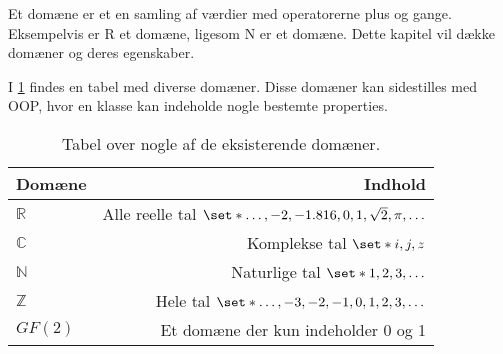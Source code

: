 Et domæne er et en samling af værdier med operatorerne plus og gange.
Eksempelvis er $\mathrm{R}$ et domæne, ligesom $ \mathrm{N}$ er et domæne.
Dette kapitel vil dække domæner og deres egenskaber.

I \cref{tab:fields} findes en tabel med diverse domæner.
Disse domæner kan sidestilles med OOP, hvor en klasse kan indeholde nogle bestemte properties.
\begin{table}[h]
    \centering
    \begin{tabular}{|l|r|}
        \hline
        Domæne & Indhold\\\hline
        $\mathbb{R}$ & Alle reelle tal $\set*{\dots,-2,-1.816,0,1,\sqrt{2},\pi,\dots}$\\
        $\mathbb{C}$ & Komplekse tal $\set*{i,j,z}$\\
        $\mathbb{N}$ & Naturlige tal $\set*{1,2,3,\dots}$\\
        $\mathbb{Z}$ & Hele tal $\set*{\dots,-3,-2,-1,0,1,2,3,\dots}$\\
        $GF(2)$ & Et domæne der kun indeholder 0 og 1\\
        \hline
    \end{tabular}
    \label{tab:fields}
    \caption{Tabel over nogle af de eksisterende domæner.}
\end{table}



